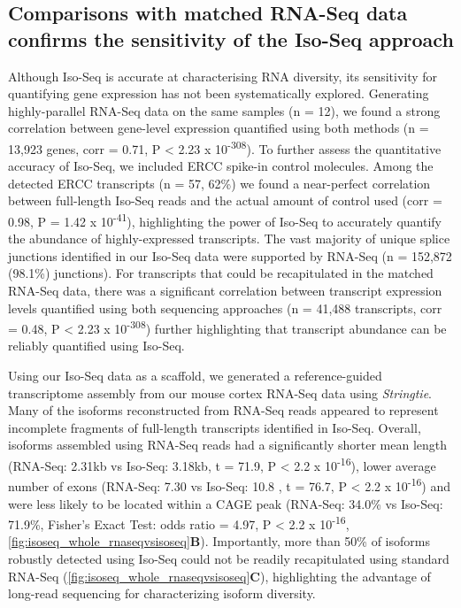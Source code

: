 	
\newpage
\subsection{Comparisons with matched RNA-Seq data confirms the sensitivity of the Iso-Seq approach} 
\label{sec: whole_isoseqvsrnaseq}
Although Iso-Seq is accurate at characterising RNA diversity\cite{Wang2019}, its sensitivity for quantifying gene expression has not been systematically explored. Generating highly-parallel RNA-Seq data on the same samples (n = 12), we found a strong correlation between gene-level expression quantified using both methods (n = 13,923 genes, corr = 0.71, P < 2.23 x 10\textsuperscript{-308}). To further assess the quantitative accuracy of Iso-Seq, we included ERCC spike-in control molecules. Among the detected ERCC transcripts (n = 57, 62\%) we found a near-perfect correlation between full-length Iso-Seq reads and the actual amount of control used (corr = 0.98, P = 1.42 x 10\textsuperscript{-41}), highlighting the power of Iso-Seq to accurately quantify the abundance of highly-expressed transcripts. The vast majority of unique splice junctions identified in our Iso-Seq data were supported by RNA-Seq (n = 152,872 (98.1\%) junctions). For transcripts that could be recapitulated in the matched RNA-Seq data, there was a significant correlation between transcript expression levels quantified using both sequencing approaches (n = 41,488 transcripts, corr = 0.48, P < 2.23 x 10\textsuperscript{-308}) further highlighting that transcript abundance can be reliably quantified using Iso-Seq. 

Using our Iso-Seq data as a scaffold, we generated a reference-guided transcriptome assembly from our mouse cortex RNA-Seq data using \textit{Stringtie}\cite{Pertea2015}. Many of the isoforms reconstructed from RNA-Seq reads appeared to represent incomplete fragments of full-length transcripts identified in Iso-Seq. Overall, isoforms assembled using RNA-Seq reads had a significantly shorter mean length (RNA-Seq: 2.31kb vs Iso-Seq: 3.18kb, t = 71.9, P < 2.2 x 10\textsuperscript{-16}), lower average number of exons (RNA-Seq: 7.30 vs Iso-Seq: 10.8 , t = 76.7, P < 2.2 x 10\textsuperscript{-16}) and were less likely to be located within a CAGE peak (RNA-Seq: 34.0\% vs Iso-Seq: 71.9\%, Fisher’s Exact Test: odds ratio = 4.97, P < 2.2 x 10\textsuperscript{-16}, \cref{fig:isoseq_whole_rnaseqvsisoseq}\textbf{B}). Importantly, more than 50\% of isoforms robustly detected using Iso-Seq could not be readily recapitulated using standard RNA-Seq (\cref{fig:isoseq_whole_rnaseqvsisoseq}\textbf{C}), highlighting the advantage of long-read sequencing for characterizing isoform diversity.%

